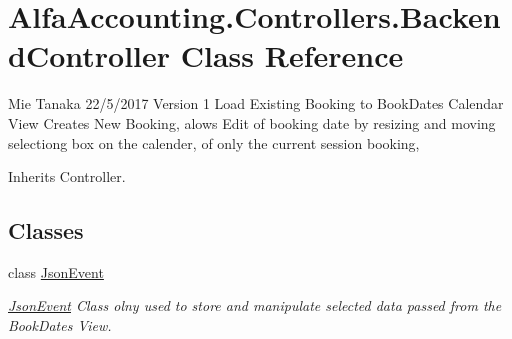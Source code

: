 \hypertarget{class_alfa_accounting_1_1_controllers_1_1_backend_controller}{}\section{Alfa\+Accounting.\+Controllers.\+Backend\+Controller Class Reference}
\label{class_alfa_accounting_1_1_controllers_1_1_backend_controller}


Mie Tanaka 22/5/2017 Version 1 Load Existing Booking to Book\+Dates Calendar View Creates New Booking, alows Edit of booking date by resizing and moving selectiong box on the calender, of only the current session booking,  




Inherits Controller.

\subsection*{Classes}
\begin{DoxyCompactItemize}
\item 
class \hyperlink{class_alfa_accounting_1_1_controllers_1_1_backend_controller_1_1_json_event}{Json\+Event}
\begin{DoxyCompactList}\small\item\em \hyperlink{class_alfa_accounting_1_1_controllers_1_1_backend_controller_1_1_json_event}{Json\+Event} Class olny used to store and manipulate selected data passed from the Book\+Dates View. \end{DoxyCompactList}\end{DoxyCompactItemize}
